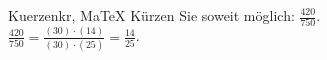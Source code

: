 \begin{MAufgabe}{Kuerzen}{kr, MaTeX}
K\"urzen Sie soweit m\"oglich: $\frac{420}{750}$.\\ 
\ifLsg\MLoesung
\quad $\frac{420}{750}=\frac{(30)\cdot(14)}{(30)\cdot(25)}=\frac{14}{25}$.\else\relax\fi
 \end{MAufgabe}